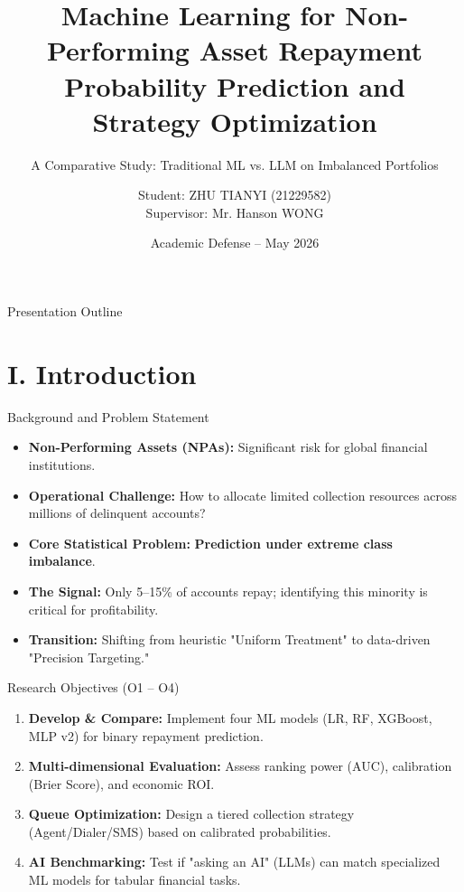 \documentclass[10pt]{beamer}
\title[ML for NPA Repayment Prediction]{\textrm{\textbf{Machine Learning for Non-Performing Asset Repayment Probability Prediction and Strategy Optimization}}}
\subtitle{\textrm{A Comparative Study: Traditional ML vs. LLM on Imbalanced Portfolios}}
\author[ZHU TIANYI]{\textrm{Student: ZHU TIANYI (21229582)\\[0.5ex] Supervisor: Mr. Hanson WONG}}
\institute[HKUST]{\textrm{The Hong Kong University of Science and Technology}}
\date[May 2026]{\textrm{Academic Defense -- May 2026}}
\begin{document}
\frame{\titlepage}

\begin{frame}{\textrm{Presentation Outline}}
\tableofcontents[hideallsubsections]
\end{frame}

\section{I. Introduction}

\begin{frame}{\textrm{Background and Problem Statement}}
    \begin{itemize}
        \item \textbf{Non-Performing Assets (NPAs):} Significant risk for global financial institutions.
        \item \textbf{Operational Challenge:} How to allocate limited collection resources across millions of delinquent accounts?
        \item \textbf{Core Statistical Problem:} \textbf{Prediction under extreme class imbalance}.
        \item \textbf{The Signal:} Only 5--15\% of accounts repay; identifying this minority is critical for profitability.
        \item \textbf{Transition:} Shifting from heuristic "Uniform Treatment" to data-driven "Precision Targeting."
    \end{itemize}
\end{frame}

\begin{frame}{\textrm{Research Objectives (O1 -- O4)}}
    \begin{enumerate}
        \item \textbf{Develop \& Compare:} Implement four ML models (LR, RF, XGBoost, MLP v2) for binary repayment prediction.
        \item \textbf{Multi-dimensional Evaluation:} Assess ranking power (AUC), calibration (Brier Score), and economic ROI.
        \item \textbf{Queue Optimization:} Design a tiered collection strategy (Agent/Dialer/SMS) based on calibrated probabilities.
        \item \textbf{AI Benchmarking:} Test if "asking an AI" (LLMs) can match specialized ML models for tabular financial tasks.
    \end{enumerate}
\end{frame}
\end{document}
